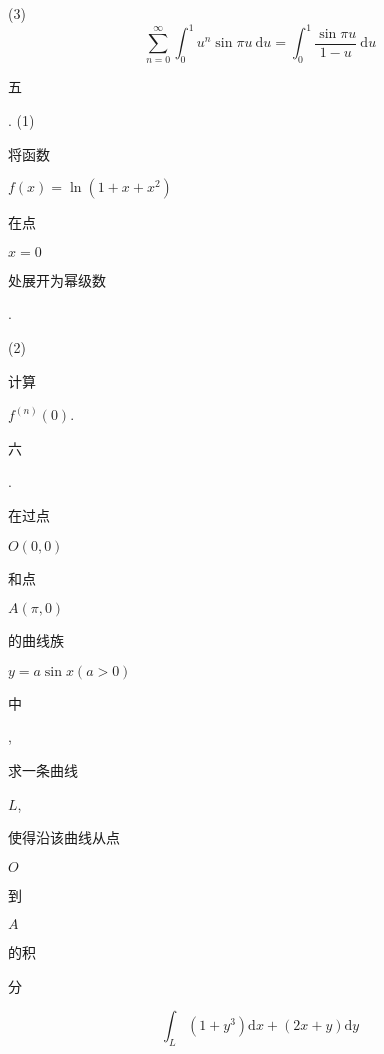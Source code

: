 \documentclass[10pt]{article}
\begin{document}
(3)
$$
\sum_{n=0}^{\infty} \int_{0}^{1} u^{n} \sin \pi u \mathrm{~d} u=\int_{0}^{1} \frac{\sin \pi u}{1-u} \mathrm{~d} u
$$
\begin{CJK}{UTF8}{mj}五\end{CJK}. (1) \begin{CJK}{UTF8}{mj}将函数\end{CJK} $f(x)=\ln \left(1+x+x^{2}\right)$ \begin{CJK}{UTF8}{mj}在点\end{CJK} $x=0$ \begin{CJK}{UTF8}{mj}处展开为幂级数\end{CJK}.

(2) \begin{CJK}{UTF8}{mj}计算\end{CJK} $f^{(n)}(0)$.

\begin{CJK}{UTF8}{mj}六\end{CJK}. \begin{CJK}{UTF8}{mj}在过点\end{CJK} $O(0,0)$ \begin{CJK}{UTF8}{mj}和点\end{CJK} $A(\pi, 0)$ \begin{CJK}{UTF8}{mj}的曲线族\end{CJK} $y=a \sin x(a>0)$ \begin{CJK}{UTF8}{mj}中\end{CJK}, \begin{CJK}{UTF8}{mj}求一条曲线\end{CJK} $L$, \begin{CJK}{UTF8}{mj}使得沿该曲线从点\end{CJK} $O$ \begin{CJK}{UTF8}{mj}到\end{CJK} $A$ \begin{CJK}{UTF8}{mj}的积\end{CJK} \begin{CJK}{UTF8}{mj}分\end{CJK}
$$
\int_{L}\left(1+y^{3}\right) \mathrm{d} x+(2 x+y) \mathrm{d} y
$$
\end{document}
